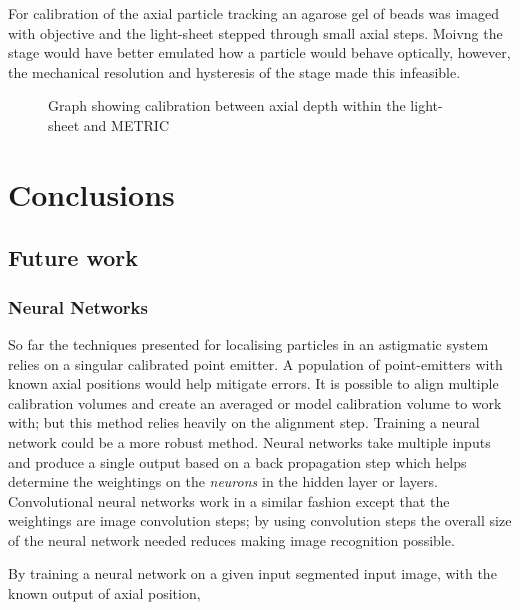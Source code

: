 For calibration of the axial particle tracking an agarose gel of beads was imaged with objective and the light-sheet stepped through small axial steps.
Moivng the stage would have better emulated how a particle would behave optically, however, the mechanical resolution and hysteresis of the stage made this infeasible.

\begin{figure}
  \centering
  \caption{Graph showing calibration between axial depth within the light-sheet and METRIC}
  \label{}
\end{figure}

\section{Conclusions}


\subsection{Future work}

\subsubsection{Neural Networks} %

So far the techniques presented for localising particles in an astigmatic system relies on a singular calibrated point emitter.
A population of point-emitters with known axial positions would help mitigate errors.
It is possible to align multiple calibration volumes and create an averaged or model calibration volume to work with; but this method relies heavily on the alignment step.
Training a neural network could be a more robust method.
Neural networks take multiple inputs and produce a single output based on a back propagation step which helps determine the weightings on the \emph{neurons} in the hidden layer or layers.
Convolutional neural networks work in a similar fashion except that the weightings are image convolution steps; by using convolution steps the overall size of the neural network needed reduces making image recognition possible.

By training a neural network on a given input segmented input image, with the known output of axial position,



